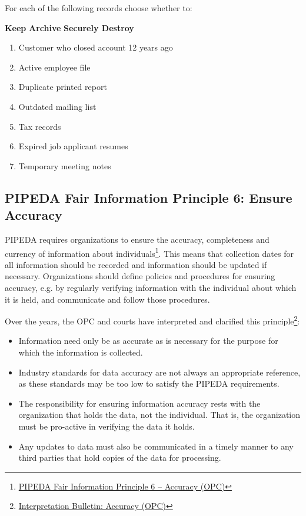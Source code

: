 \begin{exerciseboxpaper}
For each of the following records choose whether to: \\

\begin{center}
\textbf{Keep} \quad \textbf{Archive} \quad \textbf{Securely Destroy}
\end{center}
\bigskip
\begin{enumerate}
\item Customer who closed account 12 years ago
\item Active employee file
\item Duplicate printed report 
\item Outdated mailing list 
\item Tax records 
\item Expired job applicant resumes 
\item Temporary meeting notes 
\end{enumerate}
\end{exerciseboxpaper}

\subsection*{PIPEDA Fair Information Principle 6: Ensure Accuracy}

PIPEDA requires organizations to ensure the accuracy, completeness and currency of information about individuals\footnote{\href{https://www.priv.gc.ca/en/privacy-topics/privacy-laws-in-canada/the-personal-information-protection-and-electronic-documents-act-pipeda/p_principle/principles/p_accuracy/}{PIPEDA Fair Information Principle 6 -- Accuracy (OPC)}}. This means that collection dates for all information should be recorded and information should be updated if necessary. Organizations should define policies and procedures for ensuring accuracy, e.g. by regularly verifying information with the individual about which it is held, and communicate and follow those procedures. 

Over the years, the OPC and courts have interpreted and clarified this principle\footnote{\href{https://www.priv.gc.ca/en/privacy-topics/privacy-laws-in-canada/the-personal-information-protection-and-electronic-documents-act-pipeda/pipeda-compliance-help/pipeda-interpretation-bulletins/interpretations_04_accuracy/}{Interpretation Bulletin: Accuracy (OPC)}}:
\begin{itemize}
\item Information need only be as accurate as is necessary for the purpose for which the information is collected. 
\item Industry standards for data accuracy are not always an appropriate reference, as these standards may be too low to satisfy the PIPEDA requirements. 
\item The responsibility for ensuring information accuracy rests with the organization that holds the data, not the individual. That is, the organization must be pro-active in verifying the data it holds. \item Any updates to data must also be communicated in a timely manner to any third parties that hold copies of the data for processing. 
\end{itemize}

